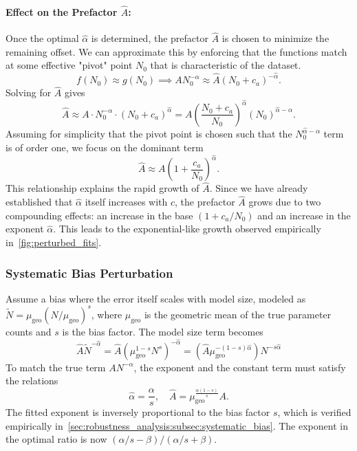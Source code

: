 \paragraph{Effect on the Prefactor $\hat{A}$:}
Once the optimal $\hat{\alpha}$ is determined, the prefactor $\hat{A}$ is chosen to minimize the remaining offset. We can approximate this by enforcing that the functions match at some effective "pivot" point $N_0$ that is characteristic of the dataset.
\begin{equation}
    f(N_0) \approx g(N_0) \implies A N_0^{-\alpha} \approx \hat{A} (N_0+c_a)^{-\hat{\alpha}}.
\end{equation}
Solving for $\hat{A}$ gives
\begin{equation}
    \hat{A} \approx A \cdot N_0^{-\alpha} \cdot (N_0+c_a)^{\hat{\alpha}} = A \left( \frac{N_0+c_a}{N_0} \right)^{\hat{\alpha}} \left(N_0\right)^{\hat{\alpha}-\alpha}.
\end{equation}
Assuming for simplicity that the pivot point is chosen such that the $N_0^{\hat{\alpha}-\alpha}$ term is of order one, we focus on the dominant term
\begin{equation}
    \hat{A} \approx A \left( 1 + \frac{c_a}{N_0} \right)^{\hat{\alpha}}.
\end{equation}
This relationship explains the rapid growth of $\hat{A}$. Since we have already established that $\hat{\alpha}$ itself increases with $c$, the prefactor $\hat{A}$ grows due to two compounding effects: an increase in the base $(1+c_a/N_0)$ and an increase in the exponent $\hat{\alpha}$. This leads to the exponential-like growth observed empirically in~\cref{fig:perturbed_fits}.



\subsubsection{Systematic Bias Perturbation}
\label{app:theoretical_analysis:subsec:systematic}

Assume a bias where the error itself scales with model size, modeled as $\tilde{N} = \mu_{\text{geo}} (N/\mu_{\text{geo}})^s$, where $\mu_{\text{geo}}$ is the geometric mean of the true parameter counts and $s$ is the bias factor. The model size term becomes
\begin{equation}
    \hat{A} \tilde{N}^{-\hat{\alpha}} = \hat{A} \left( \mu_{\text{geo}}^{1-s} N^s \right)^{-\hat{\alpha}} = \left(\hat{A} \mu_{\text{geo}}^{-(1-s)\hat{\alpha}}\right) N^{-s\hat{\alpha}}
\end{equation}
To match the true term $A N^{-\alpha}$, the exponent and the constant term must satisfy the relations
\begin{equation}
    \hat{\alpha} = \frac{\alpha}{s},
    \quad
    \hat{A}
    =
    \mu_{\text{geo}} ^{\frac{\alpha  (1-s)}{s}} A .
\end{equation}
The fitted exponent is inversely proportional to the bias factor $s$, which is verified empirically in~\cref{sec:robustness_analysis:subsec:systematic_bias}. The exponent in the optimal ratio is now $(\alpha/s - \beta)/(\alpha/s + \beta)$.

